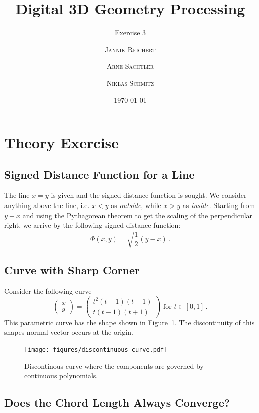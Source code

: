 \documentclass{scrartcl}
\title{Digital 3D Geometry Processing}
\subtitle{Exercise 3}
\author{\textsc{Jannik Reichert} \and \textsc{Arne Sachtler} \and \textsc{Niklas Schmitz}}
\date{\today}
\begin{document}
\maketitle

\section{Theory Exercise}

\subsection{Signed Distance Function for a Line}
The line $x = y$ is given and the signed distance function is sought.
We consider anything above the line, i.e. $x < y$ as \emph{outside},
while $x > y$ as \emph{inside}. Starting from $y - x$ and using the Pythagorean theorem
to get the scaling of the perpendicular right, we arrive by the following signed distance function:
\begin{equation}
	\Phi (x,y) = \sqrt{\frac{1}{2}} (y - x) \, .
\end{equation}

\subsection{Curve with Sharp Corner}

Consider the following curve
\begin{equation}
	\begin{pmatrix}x\\y\end{pmatrix} = \begin{pmatrix}t^2 (t-1) (t+1)\\t (t-1) (t+1)\end{pmatrix} \text{ for } t \in [0, 1]\, .
\end{equation}
This parametric curve has the shape shown in Figure~\ref{fig:disc}. The discontinuity of this shapes normal vector occurs at the origin.
\begin{figure}[h]
	\centering
	\texttt{[image: figures/discontinuous\_curve.pdf]}
	\caption{Discontinous curve where the components are governed by continuous polynomials.}
	\label{fig:disc}
\end{figure}


\newpage

\subsection{Does the Chord Length Always Converge?}
\end{document}
